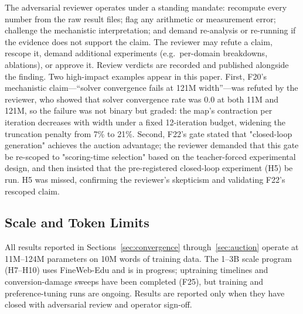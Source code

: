 The adversarial reviewer operates under a standing mandate: recompute every number from the raw result files; flag any
arithmetic or measurement error; challenge the mechanistic interpretation; and demand re-analysis or re-running if the
evidence does not support the claim. The reviewer may refute a claim, rescope it, demand additional experiments (e.g.\
per-domain breakdowns, ablations), or approve it. Review verdicts are recorded and published alongside the finding.
Two high-impact examples appear in this paper. First, F20's mechanistic claim—``solver convergence fails at 121M
width''—was refuted by the reviewer, who showed that solver convergence rate was 0.0 at both 11M and 121M, so the
failure was not binary but graded: the map's contraction per iteration decreases with width under a fixed 12-iteration
budget, widening the truncation penalty from 7\% to 21\%. Second, F22's gate stated that "closed-loop generation"
achieves the auction advantage; the reviewer demanded that this gate be re-scoped to "scoring-time selection" based
on the teacher-forced experimental design, and then insisted that the pre-registered closed-loop experiment (H5) be
run. H5 was missed, confirming the reviewer's skepticism and validating F22's rescoped claim.

\subsection{Scale and Token Limits}

All results reported in Sections~\ref{sec:convergence} through~\ref{sec:auction} operate at 11M–124M parameters on
10M words of training data. The 1–3B scale program (H7–H10) uses FineWeb-Edu and is in progress; uptraining timelines
and conversion-damage sweeps have been completed (F25), but training and preference-tuning runs are ongoing. Results
are reported only when they have closed with adversarial review and operator sign-off.

